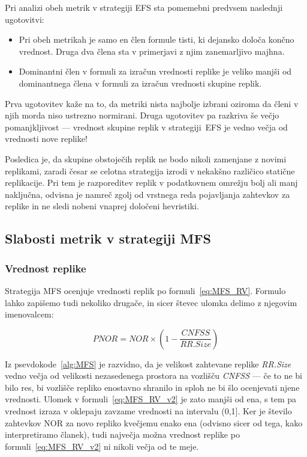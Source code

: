 \documentclass[a4paper, 12pt]{book}
\begin{document}
Pri analizi obeh metrik v strategiji EFS sta pomemebni predvsem naslednji
ugotovitvi:
\begin{itemize}
\item Pri obeh metrikah je samo en člen formule tisti, ki dejansko določa
končno vrednost. Druga dva člena sta v primerjavi z njim zanemarljivo majhna.

\item Dominantni člen v formuli za izračun vrednosti replike je veliko manjši
od dominantnega člena v formuli za izračun vrednosti skupine replik.
\end{itemize}

Prva ugotovitev kaže na to, da metriki nista najbolje izbrani oziroma da
členi v njih morda niso ustrezno normirani. Druga ugotovitev pa razkriva še
večjo pomanjkljivost --- vrednost skupine replik v strategiji~EFS je vedno
večja od vrednosti nove replike!

Posledica je, da skupine obstoječih replik ne bodo nikoli zamenjane z novimi
replikami, zaradi česar se celotna strategija izrodi v nekakšno različico
statične replikacije. Pri tem je razporeditev replik v podatkovnem
omrežju bolj ali manj naključna, odvisna je namreč zgolj od
vrstnega reda pojavljanja zahtevkov za replike in ne sledi nobeni vnaprej
določeni hevristiki.


\subsection{Slabosti metrik v strategiji MFS}
\label{ss:MFS_bad}

\subsubsection{Vrednost replike}

Strategija MFS ocenjuje vrednosti replik po formuli~\eqref{eq:MFS_RV}.
Formulo lahko zapišemo tudi nekoliko drugače, in sicer števec ulomka delimo z
njegovim imenovalcem:

\begin{equation}
  \mathit{PNOR} = \mathit{NOR} \times
                 \left(1 - \frac{\mathit{CNFSS}}{\mathit{ RR.Size}}\right)
  \label{eq:MFS_RV_v2}
\end{equation}

Iz psevdokode~\ref{alg:MFS} je razvidno, da je velikost zahtevane replike
\textit{RR.Size} vedno večja od velikosti nezasedenega prostora na vozlišču
\textit{CNFSS} --- če to ne bi bilo res, bi vozlišče repliko enostavno shranilo
in sploh ne bi šlo ocenjevati njene vrednosti. Ulomek v
formuli~\eqref{eq:MFS_RV_v2} je zato manjši od ena, s tem pa vrednost izraza v
oklepaju zavzame vrednosti na intervalu (0,1].
Ker je število zahtevkov NOR za novo repliko kvečjemu enako
ena (odvisno sicer od tega, kako interpretiramo članek), tudi največja možna
vrednost replike po formuli~\eqref{eq:MFS_RV_v2} ni nikoli večja od te meje.
\end{document}

